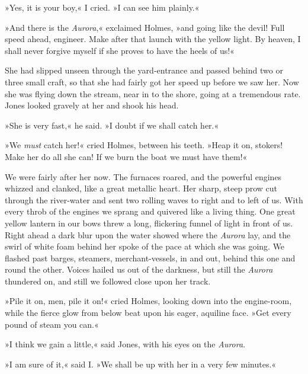 »Yes, it is your boy,« I cried. »I can see him plainly.«

»And there is the \textit{Aurora},« exclaimed Holmes, »and going like the devil! Full speed ahead, engineer. Make after that launch with the yellow light. By heaven, I shall never forgive myself if she proves to have the heels of us!«

She had slipped unseen through the yard-entrance and passed behind two or three small craft, so that she had fairly got her speed up before we saw her. Now she was flying down the stream, near in to the shore, going at a tremendous rate. Jones looked gravely at her and shook his head.

»She is very fast,« he said. »I doubt if we shall catch her.«

»We \textit{must} catch her!« cried Holmes, between his teeth. »Heap it on, stokers! Make her do all she can! If we burn the boat we must have them!«

We were fairly after her now. The furnaces roared, and the powerful engines whizzed and clanked, like a great metallic heart. Her sharp, steep prow cut through the river-water and sent two rolling waves to right and to left of us. With every throb of the engines we sprang and quivered like a living thing. One great yellow lantern in our bows threw a long, flickering funnel of light in front of us. Right ahead a dark blur upon the water showed where the \textit{Aurora} lay, and the swirl of white foam behind her spoke of the pace at which she was going. We flashed past barges, steamers, merchant-vessels, in and out, behind this one and round the other. Voices hailed us out of the darkness, but still the \textit{Aurora} thundered on, and still we followed close upon her track.

»Pile it on, men, pile it on!« cried Holmes, looking down into the engine-room, while the fierce glow from below beat upon his eager, aquiline face. »Get every pound of steam you can.«

»I think we gain a little,« said Jones, with his eyes on the \textit{Aurora}.

»I am sure of it,« said I. »We shall be up with her in a very few minutes.«

